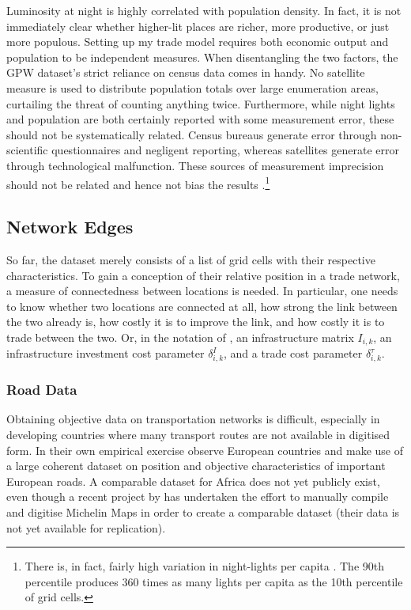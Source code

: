 \documentclass[11pt, oneside]{article}   	%
\begin{document}
Luminosity at night is highly correlated with population density. In fact, it is not immediately clear whether higher-lit places are richer, more productive, or just more populous. Setting up my trade model requires both economic output and population to be independent measures. When disentangling the two factors, the GPW dataset's strict reliance on census data comes in handy. No satellite measure is used to distribute population totals over large enumeration areas, curtailing the threat of counting anything twice. Furthermore, while night lights and population are both certainly reported with some measurement error, these should not be systematically related. Census bureaus generate error through non-scientific questionnaires and negligent reporting, whereas satellites generate error through technological malfunction. These sources of measurement imprecision should not be related and hence not bias the results \citep[see also][]{Pinkovskiy_LightsCameraIncome_2016}.\footnote{There is, in fact, fairly high variation in night-lights per capita \citep[a measure which should be employed with scientific caution and is only reported here for illustrative purposes, see][]{michalopoulos_spatial_2018}. The 90th percentile produces 360 times as many lights per capita as the 10th percentile of grid cells.}

\subsection{Network Edges}
So far, the dataset merely consists of a list of grid cells with their respective characteristics. To gain a conception of their relative position in a trade network, a measure of connectedness between locations is needed. In particular, one needs to know whether two locations are connected at all, how strong the link between the two already is, how costly it is to improve the link, and how costly it is to trade between the two. Or, in the notation of \cite{fajgelbaum_optimal_2017}, an infrastructure matrix $I_{i,k}$, an infrastructure investment cost parameter $\delta_{i,k}^{I}$, and a trade cost parameter $\delta_{i,k}^{\tau}$.

\subsubsection{Road Data}
\label{sec:road_data}
Obtaining objective data on transportation networks is difficult, especially in developing countries where many transport routes are not available in digitised form. In their own empirical exercise \citeauthor{fajgelbaum_optimal_2017} observe European countries and make use of a large coherent dataset on position and objective characteristics of important European roads. A comparable dataset for Africa does not yet publicly exist, even though a recent project by \cite{jedwab_average_2017} has undertaken the effort to manually compile and digitise Michelin Maps in order to create a comparable dataset (their data is not yet available for replication).
\end{document}
